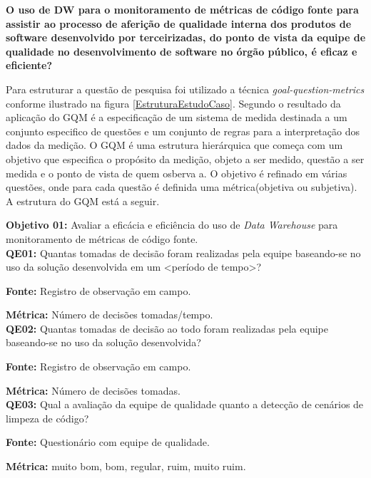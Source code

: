 \textbf{O uso de DW para o monitoramento de métricas de código fonte para assistir ao processo de aferição de qualidade interna dos produtos de software desenvolvido por terceirizadas, do ponto de vista da equipe de qualidade no desenvolvimento de software no órgão público, é eficaz e eficiente?}

Para estruturar a questão de pesquisa foi utilizado a técnica \textit{goal-question-metrics} conforme ilustrado na figura \ref{EstruturaEstudoCaso}. Segundo \cite{Basili96b} o resultado da aplicação do GQM é a especificação de um sistema de medida destinada a um conjunto especifico de questões e um conjunto de regras para a interpretação dos dados da medição. O GQM é uma estrutura hierárquica que começa com um objetivo que especifica o propósito da medição, objeto a ser medido, questão a ser medida e o ponto de vista de quem osberva a. O objetivo é refinado em várias questões, onde para cada questão é definida uma métrica(objetiva ou subjetiva)\cite{Basili96b}. A estrutura do GQM está a seguir.

\textbf{Objetivo 01:} Avaliar a eficácia e eficiência do uso de \textit{Data Warehouse} para monitoramento de métricas de código fonte.\\



\textbf{QE01:} Quantas tomadas de decisão foram realizadas pela equipe baseando-se no uso da solução desenvolvida em um <período de tempo>?

\textbf{Fonte:} Registro de observação em campo.

\textbf{Métrica:} Número de decisões tomadas/tempo. \\



\textbf{QE02: } Quantas tomadas de decisão ao todo foram realizadas pela equipe baseando-se no uso da solução desenvolvida?

\textbf{Fonte:} Registro de observação em campo.

\textbf{Métrica:} Número de decisões tomadas.\\



\textbf{QE03: } Qual a avaliação da equipe de qualidade quanto a detecção de cenários de limpeza de código?

\textbf{Fonte:} Questionário com equipe de qualidade.

\textbf{Métrica:} muito bom, bom, regular, ruim, muito ruim.\\


